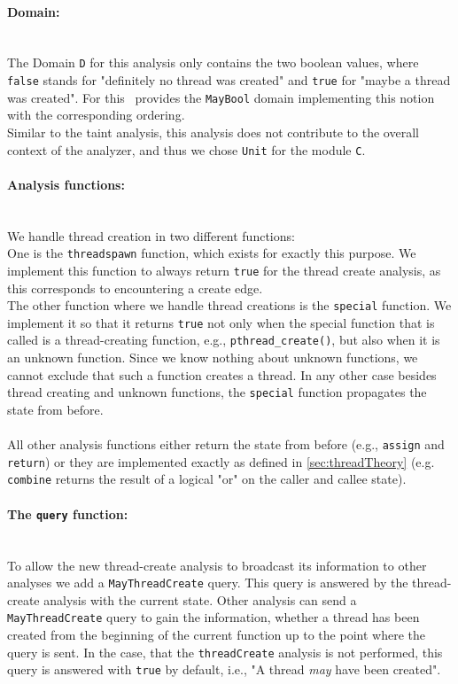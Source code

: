     \paragraph{Domain:}\mbox{}\\
    The Domain \texttt{D} for this analysis only contains the two boolean values, where \texttt{false} stands for "definitely no thread was created" and \texttt{true} for "maybe a thread was created". For this \gob\ provides the \texttt{MayBool} domain implementing this notion with the corresponding ordering.\\
    Similar to the taint analysis, this analysis does not contribute to the overall context of the analyzer, and thus we chose \texttt{Unit} for the module \texttt{C}.

    \paragraph{Analysis functions:}\mbox{}\\ We handle thread creation in two different functions:\\
    One is the \texttt{threadspawn} function, which exists for exactly this purpose. We implement this function to always return \texttt{true} for the thread create analysis, as this corresponds to encountering a create edge.\\
    The other function where we handle thread creations is the \texttt{special} function. We implement it so that it returns \texttt{true} not only when the special function that is called is a thread-creating function, e.g., \texttt{pthread\_create()}, but also when it is an unknown function. Since we know nothing about unknown functions, we cannot exclude that such a function creates a thread. In any other case besides thread creating and unknown functions, the \texttt{special} function propagates the state from before.\\
    \\
    All other analysis functions either return the state from before (e.g., \texttt{assign} and \texttt{return}) or they are implemented exactly as defined in \autoref{sec:threadTheory} (e.g. \texttt{combine} returns the result of a logical "or" on the caller and callee state).

    \paragraph{The \texttt{query} function:}\mbox{}\\
    To allow the new thread-create analysis to broadcast its information to other analyses we add a \texttt{MayThreadCreate} query. This query is answered by the thread-create analysis with the current state. Other analysis can send a \texttt{MayThreadCreate} query to gain the information, whether a thread has been created from the beginning of the current function up to the point where the query is sent. In the case, that the \texttt{threadCreate} analysis is not performed, this query is answered with \texttt{true} by default, i.e., "A thread \textit{may} have been created".\\
    \\
